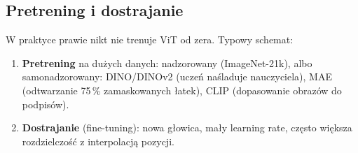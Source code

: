 \documentclass[11pt,a4paper]{article}
\begin{document}
\subsection{Pretrening i dostrajanie}
W praktyce prawie nikt nie trenuje ViT od zera. Typowy schemat:
\begin{enumerate}[itemsep=1pt]
  \item \textbf{Pretrening} na dużych danych: nadzorowany (ImageNet-21k), albo samonadzorowany: DINO/DINOv2 (uczeń naśladuje nauczyciela), MAE (odtwarzanie 75\,\% zamaskowanych łatek), CLIP (dopasowanie obrazów do podpisów).
  \item \textbf{Dostrajanie} (fine-tuning): nowa głowica, mały learning rate, często większa rozdzielczość z interpolacją pozycji.
\end{enumerate}

\end{document}
